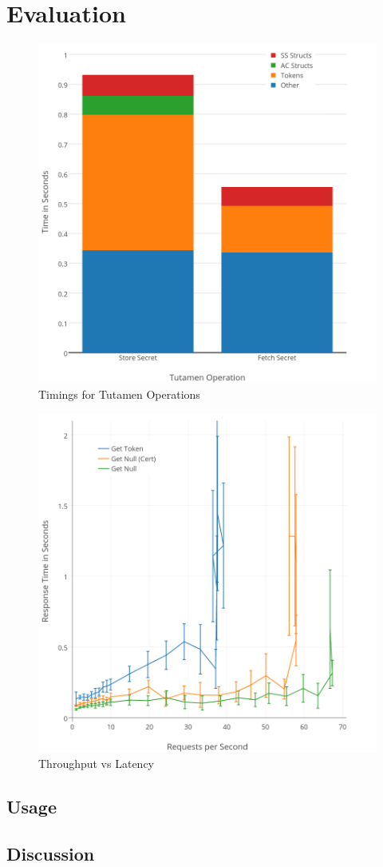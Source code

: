 \section{Evaluation}
\label{sec:eval}

\begin{figure}[th]
  \centering
  \includegraphics[width=\columnwidth]{./figs/png/chart-combined-timings.png}
  \caption{Timings for Tutamen Operations}
  \label{fig:eval:timings}
\end{figure}

\begin{figure}[th]
  \centering
  \includegraphics[width=\columnwidth]{./figs/png/chart-iops.png}
  \caption{Throughput vs Latency}
  \label{fig:eval:iops}
\end{figure}

\subsection{Usage}

\subsection{Discussion}
